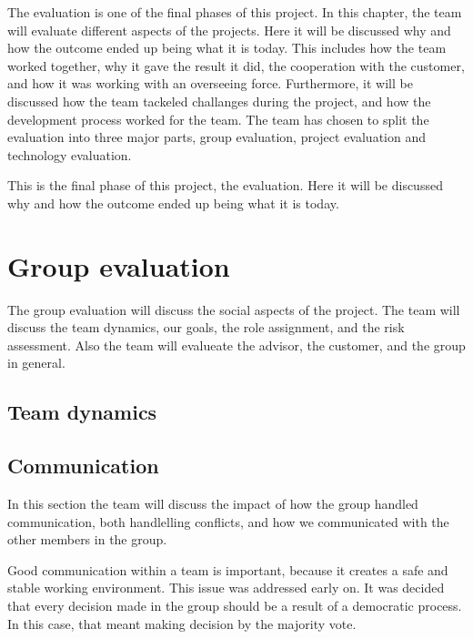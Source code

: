 The evaluation is one of the final phases of this project. In this chapter, the team will evaluate different aspects of the projects. 
Here it will be discussed why and how the outcome ended up being what it is today.
This includes how the team worked together, why it gave the result it did, the cooperation with the customer, and how it was working with an overseeing force. 
Furthermore, it will be discussed how the team tackeled challanges during the project, and how the development process worked for the team.
The team has chosen to split the evaluation into three major parts, group evaluation, project evaluation and technology evaluation. 
 
 
This is the final phase of this project, the evaluation. Here it will be discussed why and how the outcome
ended up being what it is today.  
\section{Group evaluation}
The group evaluation will discuss the social aspects of the project. 
The team will discuss the team dynamics, our goals, the role assignment, and the risk assessment. Also the team will evalueate the advisor, the customer, and the group in general.

\subsection{Team dynamics}

\subsection{Communication}
In this section the team will discuss the impact of how the group handled communication, both handlelling conflicts, and how we communicated with the other members in the group.

Good communication within a team is important, because it creates a safe and stable working
environment. This issue was addressed early on. It was decided that every decision made in the group should be a result of a democratic process. In this case, that meant making decision by the majority vote.

